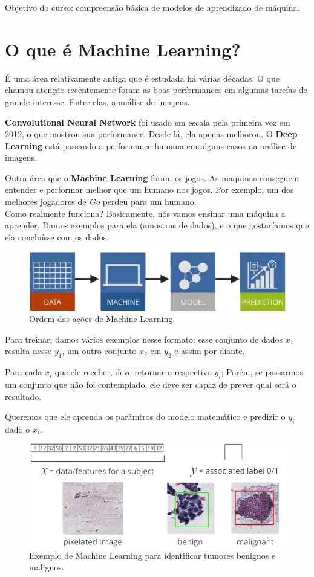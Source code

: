 \documentclass[11pt, a4paper]{article}
\begin{document}
Objetivo do curso: compreensão básica de modelos de aprendizado de máquina.

\section{O que é Machine Learning?}
É uma área relativamente antiga que é estudada há várias décadas. O que chamou atenção recentemente foram as boas performances em algumas tarefas de grande interesse. Entre elas, a análise de imagens.

\textbf{Convolutional Neural Network} foi usado em escala pela primeira vez em 2012, o que mostrou sua performance. Desde lá, ela apenas melhorou. O \textbf{Deep Learning} está passando a performance humana em alguns casos na análise de imagens.

Outra área que o \textbf{Machine Learning} foram os jogos. As maquinas conseguem entender e performar melhor que um humano nos jogos. Por exemplo, um dos melhores jogadores de \textit{Go} perdeu para um humano.\\

Como realmente funciona? Basicamente, nós vamos ensinar uma máquina a aprender. Damos exemplos para ela (amostras de dados), e o que gostaríamos que ela concluísse com os dados.

\begin{figure}[h]
\centering
\includegraphics[scale=0.5]{linear-view}
\caption{Ordem das ações de Machine Learning.}
\end{figure}

Para treinar, damos vários exemplos nesse formato: esse conjunto de dados $x_1$ resulta nesse $y_1$, um outro conjunto $x_2$ em $y_2$ e assim por diante.

Para cada $x_i$ que ele receber, deve retornar o respectivo $y_i$; Porém, se passarmos um conjunto que não foi contemplado, ele deve ser capaz de prever qual será o resultado.

Queremos que ele aprenda os parâmtros do modelo matemático e predizir o $y_i$ dado o $x_i$.

\begin{figure}[h]
\centering
\includegraphics[scale=0.5]{exemplo-ml}
\caption{Exemplo de Machine Learning para identificar tumores benignos e malignos.}
\end{figure}
\end{document}
